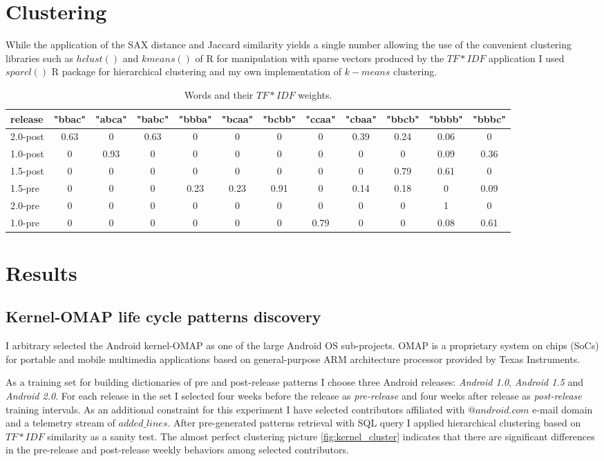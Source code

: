 \documentclass[10pt, conference, compsocconf]{IEEEtran}
\begin{document}
\section{Clustering}
While the application of the SAX distance and Jaccard similarity yields a single number allowing
the use of the convenient clustering libraries such as $hclust()$ and $kmeans()$ of R for manipulation
with sparse vectors produced by the $TF\ast IDF$ application I used $sparcl()$ R package for hierarchical
clustering and my own implementation of $k-means$ clustering.

\begin{table}
  \caption{Words and their $TF\ast IDF$ weights.}
  \tiny
  \label{tab:tokens}
  \begin{tabular}{ | l | c | c | c | c | c | c | c | c | c | c | c |}
  \hline
release & "bbac" & "abca" & "babc" & "bbba" & "bcaa" & "bcbb" & "ccaa" & "cbaa" & "bbcb" & "bbbb" & "bbbc"\\ 
  \hline
2.0-post & 0.63 & 0 & 0.63 & 0 & 0 & 0 & 0 & 0.39 & 0.24 & 0.06 & 0\\ 
1.0-post & 0 & 0.93 & 0 & 0 & 0 & 0 & 0 & 0 & 0 & 0.09 & 0.36\\ 
1.5-post & 0 & 0 & 0 & 0 & 0 & 0 & 0 & 0 & 0.79 & 0.61 & 0\\ 
1.5-pre & 0 & 0 & 0 & 0.23 & 0.23 & 0.91 & 0 & 0.14 & 0.18 & 0 & 0.09\\ 
2.0-pre & 0 & 0 & 0 & 0 & 0 & 0 & 0 & 0 & 0 & 1 & 0\\ 
1.0-pre & 0 & 0 & 0 & 0 & 0 & 0 & 0.79 & 0 & 0 & 0.08 & 0.61\\
  \hline
  \end{tabular}
\end{table}

\section{Results}
\subsection{Kernel-OMAP life cycle patterns discovery}
I arbitrary selected the Android kernel-OMAP as one of the large Android OS sub-projects. 
OMAP is a proprietary system on chips (SoCs) for portable and mobile multimedia applications 
based on general-purpose ARM architecture processor provided by Texas Instruments.

As a training set for building dictionaries of pre and post-release patterns I choose three Android releases:
\textit{Android 1.0}, \textit{Android 1.5} and \textit{Android 2.0}. For each release in the set I selected four 
weeks before the release as \textit{pre-release} and four weeks after release as \textit{post-release} 
training intervals. As an additional constraint for this experiment I have selected contributors affiliated
with $@android.com$ e-mail domain and a telemetry stream of $added\_lines$.
After pre-generated patterns retrieval with SQL query I applied hierarchical clustering 
based on $TF\ast IDF$ similarity as a sanity test. The almost perfect clustering picture \ref{fig:kernel_cluster}
indicates that there are significant differences in the pre-release and post-release weekly behaviors among 
selected contributors.
\end{document}
